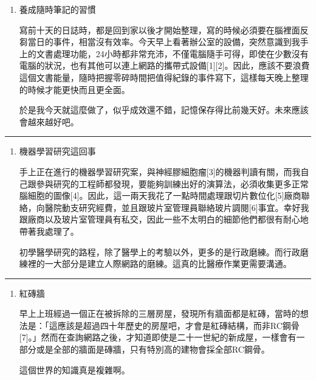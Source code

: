 \documentclass[
]{article}
\begin{document}
\begin{enumerate}
\def\labelenumi{\arabic{enumi}.}
\item
  養成隨時筆記的習慣

  寫前十天的日誌時，都是回到家以後才開始整理，寫的時候必須要在腦裡面反芻當日的事件，相當沒有效率。今天早上看著辦公室的設備，突然意識到我手上的文書處理功能，24小時都非常充沛，不僅電腦隨手可得，即使在少數沒有電腦的狀況，也有其他可以連上網路的攜帶式設備{[}1{]}{[}2{]}。因此，應該不要浪費這個文書能量，隨時把握零碎時間把值得紀錄的事件寫下，這樣每天晚上整理的時候才能更快而且更全面。

  於是我今天就這麼做了，似乎成效還不錯，記憶保存得比前幾天好。未來應該會越來越好吧。
\end{enumerate}

\begin{center}\rule{0.5\linewidth}{\linethickness}\end{center}

\begin{enumerate}
\def\labelenumi{\arabic{enumi}.}
\setcounter{enumi}{1}
\item
  機器學習研究這回事

  手上正在進行的機器學習研究案，與神經膠細胞瘤{[}3{]}的機器判讀有關，而我自己跟參與研究的工程師都發現，要能夠訓練出好的演算法，必須收集更多正常腦細胞的圖像{[}4{]}。因此，這一兩天我花了一點時間處理跟切片數位化{[}5{]}廠商聯絡，向醫院動支研究經費，並且跟玻片室管理員聯絡玻片調閱{[}6{]}事宜。幸好我跟廠商以及玻片室管理員有私交，因此一些不太明白的細節他們都很有耐心地帶著我處理了。

  初學醫學研究的路程，除了醫學上的考驗以外，更多的是行政磨練。而行政磨練裡的一大部分是建立人際網路的磨練。這真的比醫療作業更需要溝通。
\end{enumerate}

\begin{center}\rule{0.5\linewidth}{\linethickness}\end{center}

\begin{enumerate}
\def\labelenumi{\arabic{enumi}.}
\setcounter{enumi}{2}
\item
  紅磚牆

  早上上班經過一個正在被拆除的三層房屋，發現所有牆面都是紅磚，當時的想法是：「這應該是超過四十年歷史的房屋吧，才會是紅磚結構，而非RC鋼骨{[}7{]}。」然而在查詢網路之後，才知道即使是二十一世紀的新成屋，一樣會有一部分或是全部的牆面是磚牆，只有特別高的建物會採全部RC鋼骨。

  這個世界的知識真是複雜啊。
\end{enumerate}
\end{document}
